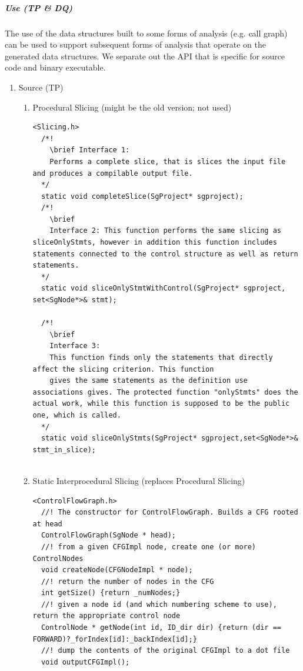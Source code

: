 \subparagraph{Use (TP \& DQ)}
   The use of the data structures built to some forms of analysis (e.g. call graph)
can be used to support subsequent forms of analysis that operate on the generated
data structures. We separate out the API that is specific for source code and 
binary executable.
\begin{enumerate}
   \item Source (TP) \\
   \begin{enumerate}

      \item Procedural Slicing (might be the old version; not used) 
      \begin{lstlisting}
<Slicing.h>
  /*!
    \brief Interface 1:
    Performs a complete slice, that is slices the input file and produces a compilable output file. 
  */
  static void completeSlice(SgProject* sgproject);
  /*! 
    \brief
    Interface 2: This function performs the same slicing as sliceOnlyStmts, however in addition this function includes statements connected to the control structure as well as return statements.
  */
  static void sliceOnlyStmtWithControl(SgProject* sgproject, set<SgNode*>& stmt);

  /*! 
    \brief
    Interface 3:
    This function finds only the statements that directly affect the slicing criterion. This function
    gives the same statements as the definition use associations gives. The protected function "onlyStmts" does the actual work, while this function is supposed to be the public one, which is called.
  */
  static void sliceOnlyStmts(SgProject* sgproject,set<SgNode*>&  stmt_in_slice);


      \end{lstlisting}


      \item Static Interprocedural Slicing (replaces Procedural Slicing)
      \begin{lstlisting}
<ControlFlowGraph.h>
  //! The constructor for ControlFlowGraph. Builds a CFG rooted at head
  ControlFlowGraph(SgNode * head);
  //! from a given CFGImpl node, create one (or more) ControlNodes
  void createNode(CFGNodeImpl * node);
  //! return the number of nodes in the CFG
  int getSize() {return _numNodes;}
  //! given a node id (and which numbering scheme to use), return the appropriate control node
  ControlNode * getNode(int id, ID_dir dir) {return (dir == FORWARD)?_forIndex[id]:_backIndex[id];}
  //! dump the contents of the original CFGImpl to a dot file
  void outputCFGImpl();


\end{lstlisting}
\end{enumerate}
\end{enumerate}
